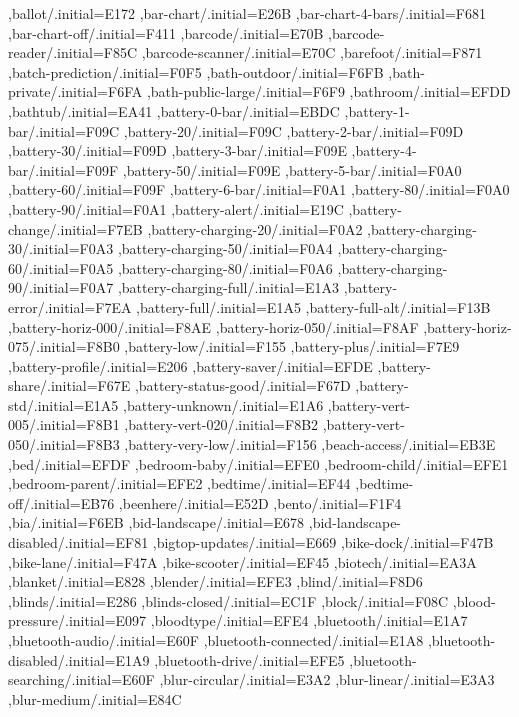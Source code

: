 { ,ballot/.initial=E172
 ,bar-chart/.initial=E26B
 ,bar-chart-4-bars/.initial=F681
 ,bar-chart-off/.initial=F411
 ,barcode/.initial=E70B
 ,barcode-reader/.initial=F85C
 ,barcode-scanner/.initial=E70C
 ,barefoot/.initial=F871
 ,batch-prediction/.initial=F0F5
 ,bath-outdoor/.initial=F6FB
 ,bath-private/.initial=F6FA
 ,bath-public-large/.initial=F6F9
 ,bathroom/.initial=EFDD
 ,bathtub/.initial=EA41
 ,battery-0-bar/.initial=EBDC
 ,battery-1-bar/.initial=F09C
 ,battery-20/.initial=F09C
 ,battery-2-bar/.initial=F09D
 ,battery-30/.initial=F09D
 ,battery-3-bar/.initial=F09E
 ,battery-4-bar/.initial=F09F
 ,battery-50/.initial=F09E
 ,battery-5-bar/.initial=F0A0
 ,battery-60/.initial=F09F
 ,battery-6-bar/.initial=F0A1
 ,battery-80/.initial=F0A0
 ,battery-90/.initial=F0A1
 ,battery-alert/.initial=E19C
 ,battery-change/.initial=F7EB
 ,battery-charging-20/.initial=F0A2
 ,battery-charging-30/.initial=F0A3
 ,battery-charging-50/.initial=F0A4
 ,battery-charging-60/.initial=F0A5
 ,battery-charging-80/.initial=F0A6
 ,battery-charging-90/.initial=F0A7
 ,battery-charging-full/.initial=E1A3
 ,battery-error/.initial=F7EA
 ,battery-full/.initial=E1A5
 ,battery-full-alt/.initial=F13B
 ,battery-horiz-000/.initial=F8AE
 ,battery-horiz-050/.initial=F8AF
 ,battery-horiz-075/.initial=F8B0
 ,battery-low/.initial=F155
 ,battery-plus/.initial=F7E9
 ,battery-profile/.initial=E206
 ,battery-saver/.initial=EFDE
 ,battery-share/.initial=F67E
 ,battery-status-good/.initial=F67D
 ,battery-std/.initial=E1A5
 ,battery-unknown/.initial=E1A6
 ,battery-vert-005/.initial=F8B1
 ,battery-vert-020/.initial=F8B2
 ,battery-vert-050/.initial=F8B3
 ,battery-very-low/.initial=F156
 ,beach-access/.initial=EB3E
 ,bed/.initial=EFDF
 ,bedroom-baby/.initial=EFE0
 ,bedroom-child/.initial=EFE1
 ,bedroom-parent/.initial=EFE2
 ,bedtime/.initial=EF44
 ,bedtime-off/.initial=EB76
 ,beenhere/.initial=E52D
 ,bento/.initial=F1F4
 ,bia/.initial=F6EB
 ,bid-landscape/.initial=E678
 ,bid-landscape-disabled/.initial=EF81
 ,bigtop-updates/.initial=E669
 ,bike-dock/.initial=F47B
 ,bike-lane/.initial=F47A
 ,bike-scooter/.initial=EF45
 ,biotech/.initial=EA3A
 ,blanket/.initial=E828
 ,blender/.initial=EFE3
 ,blind/.initial=F8D6
 ,blinds/.initial=E286
 ,blinds-closed/.initial=EC1F
 ,block/.initial=F08C
 ,blood-pressure/.initial=E097
 ,bloodtype/.initial=EFE4
 ,bluetooth/.initial=E1A7
 ,bluetooth-audio/.initial=E60F
 ,bluetooth-connected/.initial=E1A8
 ,bluetooth-disabled/.initial=E1A9
 ,bluetooth-drive/.initial=EFE5
 ,bluetooth-searching/.initial=E60F
 ,blur-circular/.initial=E3A2
 ,blur-linear/.initial=E3A3
 ,blur-medium/.initial=E84C
}
